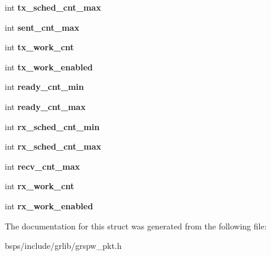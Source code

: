 \begin{DoxyCompactItemize}
\item 
\mbox{\label{structgrspw__dma__stats_ae451d632ac19198325d7f767205806c8}} 
int {\bfseries tx\+\_\+sched\+\_\+cnt\+\_\+max}
\item 
\mbox{\label{structgrspw__dma__stats_a69c786dd8eb4fe58988ba1b40e96ba18}} 
int {\bfseries sent\+\_\+cnt\+\_\+max}
\item 
\mbox{\label{structgrspw__dma__stats_a4d0e6806d8c914f10b2a291a5cfbdc96}} 
int {\bfseries tx\+\_\+work\+\_\+cnt}
\item 
\mbox{\label{structgrspw__dma__stats_ac448daf7b64ed68aae081dacfcea7eaf}} 
int {\bfseries tx\+\_\+work\+\_\+enabled}
\item 
\mbox{\label{structgrspw__dma__stats_a6b027670c24870ee3dbe2aaa3180a59d}} 
int {\bfseries ready\+\_\+cnt\+\_\+min}
\item 
\mbox{\label{structgrspw__dma__stats_a208e9456bdfaf4a3f3fb436d3ecb2010}} 
int {\bfseries ready\+\_\+cnt\+\_\+max}
\item 
\mbox{\label{structgrspw__dma__stats_a1eefc262d0d5326645d3d76452c3e86a}} 
int {\bfseries rx\+\_\+sched\+\_\+cnt\+\_\+min}
\item 
\mbox{\label{structgrspw__dma__stats_a125ae19efcc06cb106eaab759ab23d8f}} 
int {\bfseries rx\+\_\+sched\+\_\+cnt\+\_\+max}
\item 
\mbox{\label{structgrspw__dma__stats_a9ef5966c135c9de209ba74f7bb98f31e}} 
int {\bfseries recv\+\_\+cnt\+\_\+max}
\item 
\mbox{\label{structgrspw__dma__stats_abc9234aca240e59ee62c9eb22bb841ff}} 
int {\bfseries rx\+\_\+work\+\_\+cnt}
\item 
\mbox{\label{structgrspw__dma__stats_a66c53ce1c71515d2a91594e38172eb44}} 
int {\bfseries rx\+\_\+work\+\_\+enabled}
\end{DoxyCompactItemize}


The documentation for this struct was generated from the following file\+:\begin{DoxyCompactItemize}
\item 
bsps/include/grlib/grspw\+\_\+pkt.\+h\end{DoxyCompactItemize}
